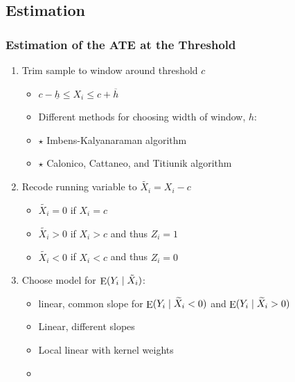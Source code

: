 \documentclass[table, xcolor = {dvipsnames}, 9pt]{beamer}
\theoremstyle{plain}
\newcommand{\mh}[1]{{\color{magenta}{#1}}}
\DeclareMathOperator{\E}{\rm{E}}
\begin{document}
\subsection{Estimation}
\begin{frame}
\frametitle{Estimation of the ATE at the Threshold}
\vfill
\begin{enumerate} \vfill
\item Trim sample to window around threshold $c$ \vfill
\begin{itemize} \vfill
\item $c - \underline{h} \leq X_i \leq c + \overline{h}$ \vfill
\item Different methods for choosing width of window, $h$: \vfill
\item[] $\star$ Imbens-Kalyanaraman algorithm \citep{imbenskalyanaraman2012} \vfill
\item[] $\star$ Calonico, Cattaneo, and Titiunik algorithm  \citep{calonicoetal2014} \vfill
\end{itemize} \vfill
\item Recode running variable to $\widetilde{X_i} = X_i - c$ \vfill
\begin{itemize} \vfill
\item $\widetilde{X_i} = 0$ if $X_i=c$ \vfill
\item $\widetilde{X_i} > 0$ if $X_i>c$ and thus $Z_i=1$ \vfill
\item $\widetilde{X_i} < 0$ if $X_i<c$ and thus $Z_i=0$ \vfill
\end{itemize} \vfill
\item Choose model for $\E(Y_i \mid \tilde X_i)$: \vfill
\begin{itemize} \vfill
\item linear, common slope for $\E(Y_i \mid \widetilde{X}_i< 0)$ and $\E(Y_i \mid \widetilde{X}_i > 0)$ \vfill
\item Linear, different slopes \vfill
\item Local linear with kernel weights \vfill
\item[] \mh{Each model makes particular modeling assumptions} \vfill
\end{itemize} \vfill
\end{enumerate} \vfill
\end{frame}
\end{document}
